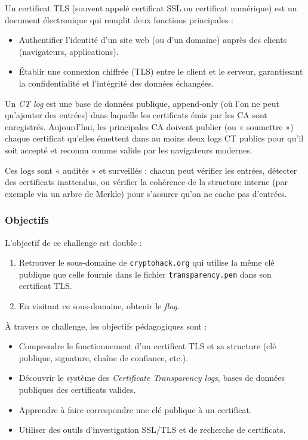 Un certificat TLS (souvent appelé certificat SSL ou certificat numérique)
est un document électronique qui remplit deux fonctions principales :
\begin{itemize}
    \item Authentifier l'identité d'un site web (ou d'un domaine) auprès
            des clients (navigateurs, applications).
    \item Établir une connexion chiffrée (TLS) entre le client et le
            serveur, garantissant la confidentialité et l'intégrité des
            données échangées.
\end{itemize}

Un \emph{CT log} est une base de données publique, append-only (où l'on ne
peut qu'ajouter des entrées) dans laquelle les certificats émis par les CA
sont enregistrés. Aujourd'hui, les principales CA doivent publier (ou
« soumettre ») chaque certificat qu'elles émettent dans au moins deux logs
CT publics pour qu'il soit accepté et reconnu comme valide par les
navigateurs modernes.

Ces logs sont « audités » et surveillés : chacun peut vérifier les entrées,
détecter des certificats inattendus, ou vérifier la cohérence de la
structure interne (par exemple via un arbre de Merkle) pour s'assurer
qu'on ne cache pas d'entrées.

\subsubsection{Objectifs}
L'objectif de ce challenge est double :
\begin{enumerate}
    \item Retrouver le sous-domaine de \texttt{cryptohack.org} qui utilise
            la même clé publique que celle fournie dans le fichier
            \texttt{transparency.pem} dans son certificat TLS.
    \item En visitant ce sous-domaine, obtenir le \emph{flag}.
\end{enumerate}

À travers ce challenge, les objectifs pédagogiques sont :
\begin{itemize}
    \item Comprendre le fonctionnement d’un certificat TLS et sa
            structure (clé publique, signature, chaîne de confiance, etc.).
    \item Découvrir le système des \emph{Certificate Transparency logs},
            bases de données publiques des certificats valides.
    \item Apprendre à faire correspondre une clé publique à un certificat.
    \item Utiliser des outils d’investigation SSL/TLS et de recherche de
            certificats.
\end{itemize}

